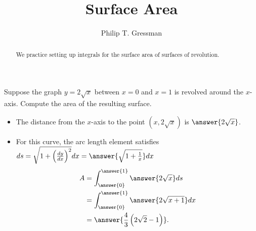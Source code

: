 \documentclass{ximera}
\title{Surface Area}
\author{Philip T. Gressman}
\begin{document}
\begin{abstract}
We practice setting up integrals for the surface area of surfaces of revolution.
\end{abstract}
\maketitle

\begin{example}
Suppose the graph $y = 2\sqrt{x}$ between $x = 0$ and $x = 1$ is revolved around the $x$-axis. Compute the area of the resulting surface.
\begin{itemize}
\item The distance from the $x$-axis to the point $(x,2\sqrt{x})$ is $\answer{2 \sqrt{x}}$.
\item For this curve, the arc length element satisfies $ds = \sqrt{1 + \left( \frac{dy}{dx} \right)^2} dx = \answer{\sqrt{1 + \frac{1}{x}}} dx$
\[ \begin{aligned} A & = \int_{\answer{0}}^{\answer{1}} \answer{2\sqrt{x}} ds \\
& = \int_{\answer{0}}^{\answer{1}} \answer{2 \sqrt{x+1}} dx \\
&= \answer{\frac{4}{3} \left( 2\sqrt{2} - 1 \right)}.
\end{aligned} \]
\end{itemize}
\end{example}
\end{document}
